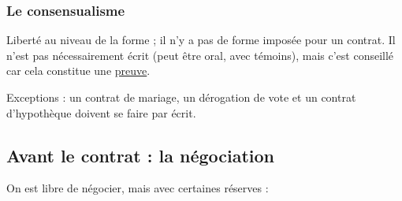 			\subsubsection{Le consensualisme}
			
			Liberté au niveau de la forme ; il n'y a pas de forme imposée pour un contrat. Il n'est pas nécessairement écrit (peut être oral, avec témoins), mais c'est conseillé car cela constitue une \underline{preuve}.
		
			Exceptions : un contrat de mariage, un dérogation de vote et un contrat d'hypothèque doivent se faire par écrit.
			
		\subsection{Avant le contrat : la négociation}
		
		On est libre de négocier, mais avec certaines réserves :
		
